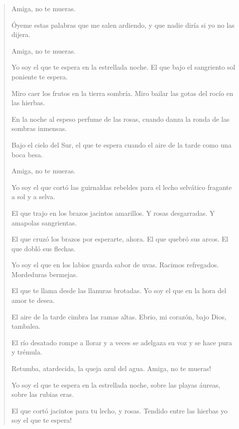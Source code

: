 \documentclass[12pt]{article}
\begin{document}
\clearpage
{}
\begin{verse}
Amiga, no te mueras.  
	
Óyeme estas palabras que me salen ardiendo,  
y que nadie diría si yo no las dijera.  
	
Amiga, no te mueras.  
	
Yo soy el que te espera en la estrellada noche.  
El que bajo el sangriento sol poniente te espera.  
	
Miro caer los frutos en la tierra sombría.  
Miro bailar las gotas del rocío en las hierbas.  
	
En la noche al espeso perfume de las rosas,  
cuando danza la ronda de las sombras inmensas.  
	
Bajo el cielo del Sur, el que te espera cuando  
el aire de la tarde como una boca besa.  
	
Amiga, no te mueras.  
	
Yo soy el que cortó las guirnaldas rebeldes  
para el lecho selvático fragante a sol y a selva.  
	
El que trajo en los brazos jacintos amarillos.  
Y rosas desgarradas. Y amapolas sangrientas.  
	
El que cruzó los brazos por esperarte, ahora.  
El que quebró sus arcos. El que dobló sus flechas.  
	
Yo soy el que en los labios guarda sabor de uvas.  
Racimos refregados. Mordeduras bermejas.  
	
El que te llama desde las llanuras brotadas.  
Yo soy el que en la hora del amor te desea.  
	
El aire de la tarde cimbra las ramas altas.  
Ebrio, mi corazón, bajo Dios, tambalea.  
	
El río desatado rompe a llorar y a veces  
se adelgaza su voz y se hace pura y trémula.  
	
Retumba, atardecida, la queja azul del agua.  
Amiga, no te mueras!  
	
Yo soy el que te espera en la estrellada noche,  
sobre las playas áureas, sobre las rubias eras.  
	
El que cortó jacintos para tu lecho, y rosas.  
Tendido entre las hierbas yo soy el que te espera!

\end{verse}
\end{document}

